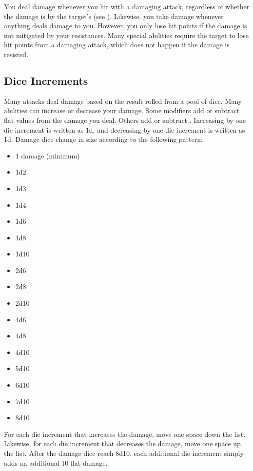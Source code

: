     You deal damage whenever you hit with a damaging attack, regardless of whether the damage is  by the target's  (see ).
    Likewise, you take damage whenever anything deals damage to you.
    However, you only lose hit points if the damage is not mitigated by your resistances.
    Many special abilities require the target to lose hit points from a damaging attack, which does not happen if the damage is resisted.

    \subsection{Dice Increments}\label{Dice Increments}
        Many attacks deal damage based on the result rolled from a pool of dice.
        Many abilities can increase or decrease your damage.
        Some modifiers add or subtract flat values from the damage you deal.
        Others add or subtract .
        Increasing by one die increment is written as \plus1d, and decreasing by one die increment is written as \minus1d.
        Damage dice change in size according to the following pattern:
        \begin{itemize}
            \item 1 damage (minimum)
            \item 1d2
            \item 1d3
            \item 1d4
            \item 1d6
            \item 1d8
            \item 1d10
            \item 2d6
            \item 2d8
            \item 2d10
            \item 4d6
            \item 4d8
            \item 4d10
            \item 5d10
            \item 6d10
            \item 7d10
            \item 8d10
        \end{itemize}

        For each die increment that increases the damage, move one space down the list.
        Likewise, for each die increment that decreases the damage, move one space up the list.
        After the damage dice reach 8d10, each additional die increment simply adds an additional 10 flat damage.

